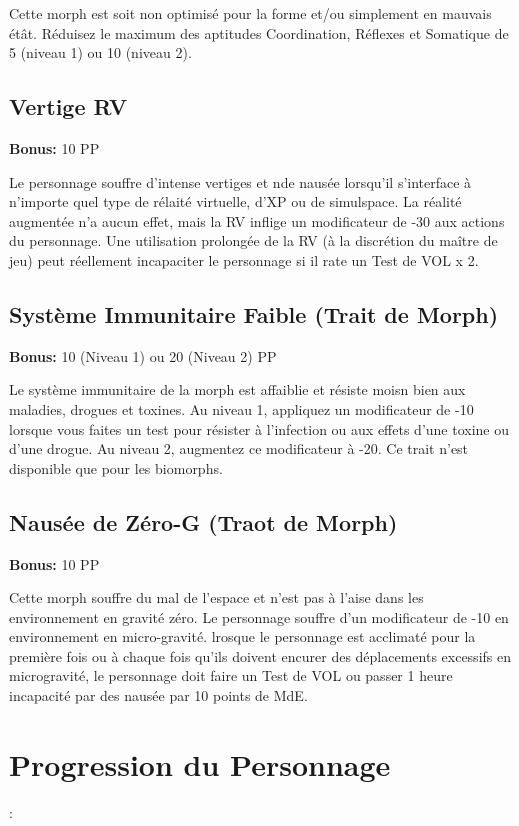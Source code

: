 Cette morph est soit non optimisé pour la forme et/ou simplement en mauvais étât. Réduisez le maximum des aptitudes Coordination, Réflexes et Somatique de 5 (niveau 1) ou 10 (niveau 2). 

\subsection{Vertige RV} \label{sec:traits-vr-vertigo} 

\textbf{Bonus:} 10 PP 

Le personnage souffre d'intense vertiges et nde nausée lorsqu'il s'interface à n'importe quel type de rélaité virtuelle, d'XP ou de simulspace. La réalité augmentée n'a aucun effet, mais la RV inflige un modificateur de -30 aux actions du personnage. Une utilisation prolongée de la RV (à la discrétion du maître de jeu) peut réellement incapaciter le personnage si il rate un Test de VOL x 2. 

\subsection{Système Immunitaire Faible (Trait de Morph)} \label{sec:traits-weak-immune-system} 

\textbf{Bonus:} 10 (Niveau 1) ou 20 (Niveau 2) PP 

Le système immunitaire de la morph est affaiblie et résiste moisn bien aux maladies, drogues et toxines. Au niveau 1, appliquez un modificateur de -10 lorsque vous faites un test pour résister à l'infection ou aux effets d'une toxine ou d'une drogue. Au niveau 2, augmentez ce modificateur à -20. Ce trait n'est disponible que pour les biomorphs. 

\subsection{Nausée de Zéro-G (Traot de Morph)} \label{sec:traits-zero-g-nausea} 

\textbf{Bonus:} 10 PP 

Cette morph souffre du mal de l'espace et n'est pas à l'aise dans les environnement en gravité zéro. Le personnage souffre d'un modificateur de -10 en environnement en micro-gravité. lrosque le personnage est acclimaté pour la première fois ou à chaque fois qu'ils doivent encurer des déplacements excessifs en microgravité, le personnage doit faire un Test de VOL ou passer 1 heure incapacité par des nausée par 10 points de MdE. 

\section{Progression du Personnage}: \label{sec:character-advancement} 

